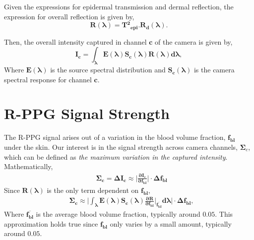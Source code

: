 Given the expressions for epidermal transmission and dermal reflection, the expression for overall reflection is given by,
\begin{equation}
    \mathbf{R(\boldsymbol\lambda) = T{^2}_{epi}.R_{d}(\boldsymbol\lambda)}.
\end{equation}

Then, the overall intensity captured in channel $\mathbf{c}$ of the camera is given by,
\begin{equation}
    \mathbf{I_c=\boldsymbol\int_{\boldsymbol\lambda}E(\boldsymbol\lambda)S_{c}(\boldsymbol\lambda)R(\boldsymbol\lambda)d\boldsymbol\lambda},
\end{equation}
Where $\mathbf{E(\boldsymbol\lambda)}$ is the source spectral distribution and $\mathbf{S_{c}(\boldsymbol\lambda)}$ is the camera spectral response for channel $\mathbf{c}$.

\section{R-PPG Signal Strength} 

The R-PPG signal arises out of a variation in the blood volume fraction, $\mathbf{f_{bl}}$ under the skin. Our interest is in the signal strength across camera channels, $\boldsymbol\Sigma_{c}$, which can be defined as \textit{the maximum variation in the captured intensity}. Mathematically,
\begin{equation}
\begin{split}
    &\mathbf{\boldsymbol\Sigma_{c}=\boldsymbol\Delta I_c\boldsymbol\approx \Big|\frac{\boldsymbol\partial I_c}{\boldsymbol\partial f_{bl}}\Big|\cdot\boldsymbol\Delta f_{bl}}
\end{split}
\end{equation}
Since $\mathbf{R(\boldsymbol\lambda)}$ is the only term dependent on $\mathbf{f_{bl}}$,
\begin{equation}
\begin{split}
    &\mathbf{\boldsymbol\Sigma_{c}\boldsymbol\approx  \Big|\boldsymbol\int_{\boldsymbol\lambda}E(\boldsymbol\lambda)S_{c}(\boldsymbol\lambda)\frac{\boldsymbol\partial R}{\boldsymbol\partial f_{bl}}\Bigg|_{\overline{f_{bl}}} d\boldsymbol\lambda \Big| \cdot \boldsymbol\Delta f_{bl}},
\end{split}
\end{equation}
Where $\mathbf{\overline{f_{bl}}}$ is the average blood volume fraction, typically around $0.05$. This approximation holds true since $\mathbf{f_{bl}}$ only varies by a small amount, typically around $0.05$. 

